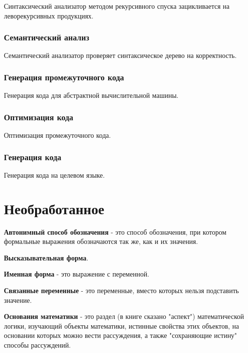 \documentclass[oneside]{book}
\begin{document}
    Синтаксический анализатор методом рекурсивного спуска зацикливается
    на леворекурсивных продукциях.

    \subsection{Семантический анализ}
    Семантический анализатор проверяет синтаксическое дерево на корректность.

    \subsection{Генерация промежуточного кода}
    Генерация кода для абстрактной вычислительной машины.

    \subsection{Оптимизация кода}
    Оптимизация промежуточного кода.

    \subsection{Генерация кода}
    Генерация кода на целевом языке.

    \chapter{Необработанное}
    \textbf{Автонимный способ обозначения} - это
    способ обозначения,
    при котором формальные выражения обозначаются так же,
    как и их значения.

    \textbf{Высказывательная форма}.

    \textbf{Именная форма} - это
    выражение с переменной.

    \textbf{Связанные переменные} - это
    переменные, вместо которых
    нельзя подставить значение.

    \textbf{Основания математики} - это
    раздел (в книге сказано "аспект")
    математической логики,
    изучающий объекты математики,
    истинные свойства этих объектов,
    на основании которых можно вести рассуждения,
    а также "сохраняющие истину"{ }способы рассуждений.
\end{document}

